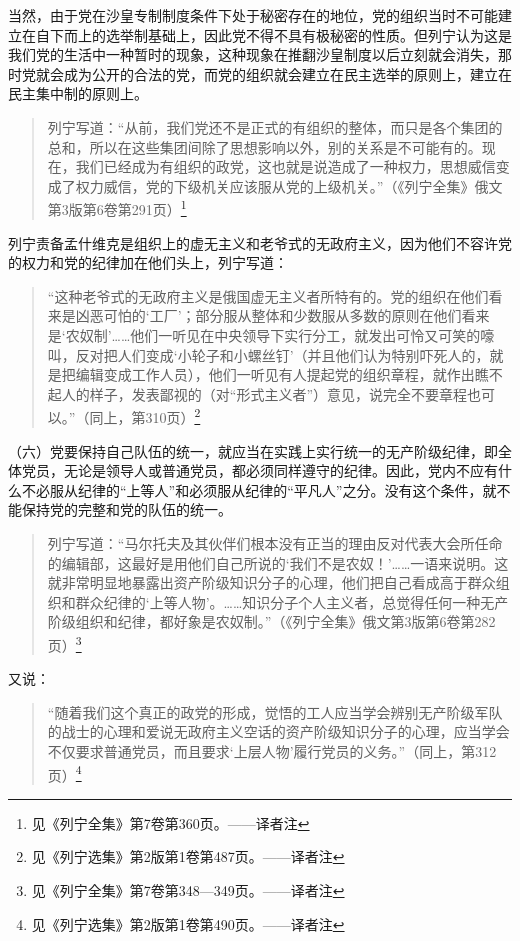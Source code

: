 当然，由于党在沙皇专制制度条件下处于秘密存在的地位，党的组织当时不可能建立在自下而上的选举制基础上，因此党不得不具有极秘密的性质。但列宁认为这是我们党的生活中一种暂时的现象，这种现象在推翻沙皇制度以后立刻就会消失，那时党就会成为公开的合法的党，而党的组织就会建立在民主选举的原则上，建立在民主集中制的原则上。

\begin{quotation}
列宁写道：“从前，我们党还不是正式的有组织的整体，而只是各个集团的总和，所以在这些集团间除了思想影响以外，别的关系是不可能有的。现在，我们已经成为有组织的政党，这也就是说造成了一种权力，思想威信变成了权力威信，党的下级机关应该服从党的上级机关。”（《列宁全集》俄文第3版第6卷第291页）\footnote{见《列宁全集》第7卷第360页。——译者注}
\end{quotation}

列宁责备孟什维克是组织上的虚无主义和老爷式的无政府主义，因为他们不容许党的权力和党的纪律加在他们头上，列宁写道：

\begin{quotation}
“这种老爷式的无政府主义是俄国虚无主义者所特有的。党的组织在他们看来是凶恶可怕的‘工厂’；部分服从整体和少数服从多数的原则在他们看来是‘农奴制’……他们一听见在中央领导下实行分工，就发出可怜又可笑的嚎叫，反对把人们变成‘小轮子和小螺丝钉’（并且他们认为特别吓死人的，就是把编辑变成工作人员），他们一听见有人提起党的组织章程，就作出瞧不起人的样子，发表鄙视的（对“形式主义者”）意见，说完全不要章程也可以。”（同上，第310页）\footnote{见《列宁选集》第2版第1卷第487页。——译者注}
\end{quotation}

（六）党要保持自己队伍的统一，就应当在实践上实行统一的无产阶级纪律，即全体党员，无论是领导人或普通党员，都必须同样遵守的纪律。因此，党内不应有什么不必服从纪律的“上等人”和必须服从纪律的“平凡人”之分。没有这个条件，就不能保持党的完整和党的队伍的统一。

\begin{quotation}
列宁写道：“马尔托夫及其伙伴们根本没有正当的理由反对代表大会所任命的编辑部，这最好是用他们自己所说的‘我们不是农奴！’……一语来说明。这就非常明显地暴露出资产阶级知识分子的心理，他们把自己看成高于群众组织和群众纪律的‘上等人物’。……知识分子个人主义者，总觉得任何一种无产阶级组织和纪律，都好象是农奴制。”（《列宁全集》俄文第3版第6卷第282页）\footnote{见《列宁全集》第7卷第348—349页。——译者注}
\end{quotation}

又说：

\begin{quotation}
“随着我们这个真正的政党的形成，觉悟的工人应当学会辨别无产阶级军队的战士的心理和爱说无政府主义空话的资产阶级知识分子的心理，应当学会不仅要求普通党员，而且要求‘上层人物’履行党员的义务。”（同上，第312页）\footnote{见《列宁选集》第2版第1卷第490页。——译者注}
\end{quotation}

